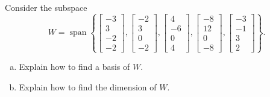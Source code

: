 
\begin{exerciseStatement}


Consider the subspace \[W=\operatorname{span}  \left\{ \left[\begin{array}{c}
-3 \\
3 \\
-2 \\
-2
\end{array}\right] , \left[\begin{array}{c}
-2 \\
3 \\
0 \\
-2
\end{array}\right] , \left[\begin{array}{c}
4 \\
-6 \\
0 \\
4
\end{array}\right] , \left[\begin{array}{c}
-8 \\
12 \\
0 \\
-8
\end{array}\right] , \left[\begin{array}{c}
-3 \\
-1 \\
3 \\
2
\end{array}\right] \right\} .\]


\begin{enumerate}[(a)]
\item  Explain how to find a basis of \(W\).
\item  Explain how to find the dimension of \(W\).
\end{enumerate}
    
\end{exerciseStatement}
    
